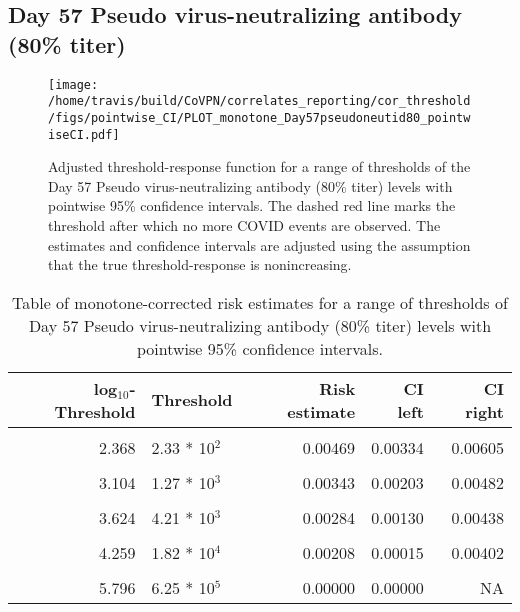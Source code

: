 \documentclass[]{book}
\theoremstyle{definition}
\theoremstyle{definition}
\theoremstyle{definition}
\newcommand{\1}{\mathbbm{1}}
\begin{document}
\clearpage

\clearpage

\clearpage

\hypertarget{day-57-pseudo-virus-neutralizing-antibody-80-titer-1}{%
\subsection{Day 57 Pseudo virus-neutralizing antibody (80\% titer)}\label{day-57-pseudo-virus-neutralizing-antibody-80-titer-1}}

\begin{figure}[H]
\centering
\texttt{[image: /home/travis/build/CoVPN/correlates\_reporting/cor\_threshold/figs/pointwise\_CI/PLOT\_monotone\_Day57pseudoneutid80\_pointwiseCI.pdf]}
\caption{Adjusted threshold-response function for a range of thresholds of the
  Day 57 Pseudo virus-neutralizing antibody (80\% titer) levels with pointwise 95\% confidence intervals. The dashed red line marks the threshold after which no more COVID events are observed. The estimates and confidence intervals are adjusted using the assumption that the true threshold-response is nonincreasing.}
\end{figure}
\begin{table}[!h]

\caption{\label{tab:unnamed-chunk-369}Table of monotone-corrected risk estimates for a range of thresholds of Day 57 Pseudo virus-neutralizing antibody (80\% titer) levels with pointwise 95\% confidence intervals.}
\centering
\begin{tabular}[t]{rlrrr}
\toprule
log$_{10}$-Threshold & Threshold & Risk estimate & CI left & CI right\\
\midrule
\cellcolor{gray!6}{1.289} & \cellcolor{gray!6}{1.95 * 10$^1$} & \cellcolor{gray!6}{0.00514} & \cellcolor{gray!6}{0.00381} & \cellcolor{gray!6}{0.00647}\\
2.368 & 2.33 * 10$^2$ & 0.00469 & 0.00334 & 0.00605\\
\cellcolor{gray!6}{2.755} & \cellcolor{gray!6}{5.69 * 10$^2$} & \cellcolor{gray!6}{0.00428} & \cellcolor{gray!6}{0.00290} & \cellcolor{gray!6}{0.00565}\\
3.104 & 1.27 * 10$^3$ & 0.00343 & 0.00203 & 0.00482\\
\cellcolor{gray!6}{3.373} & \cellcolor{gray!6}{2.36 * 10$^3$} & \cellcolor{gray!6}{0.00312} & \cellcolor{gray!6}{0.00171} & \cellcolor{gray!6}{0.00454}\\
3.624 & 4.21 * 10$^3$ & 0.00284 & 0.00130 & 0.00438\\
\cellcolor{gray!6}{3.909} & \cellcolor{gray!6}{8.11 * 10$^3$} & \cellcolor{gray!6}{0.00243} & \cellcolor{gray!6}{0.00083} & \cellcolor{gray!6}{0.00402}\\
4.259 & 1.82 * 10$^4$ & 0.00208 & 0.00015 & 0.00402\\
\cellcolor{gray!6}{4.676} & \cellcolor{gray!6}{4.74 * 10$^4$} & \cellcolor{gray!6}{0.00208} & \cellcolor{gray!6}{0.00000} & \cellcolor{gray!6}{0.00520}\\
5.796 & 6.25 * 10$^5$ & 0.00000 & 0.00000 & NA\\
\bottomrule
\end{tabular}
\end{table}
\end{document}
